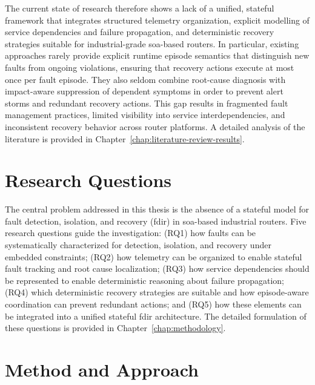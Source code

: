 The current state of research therefore shows a lack of a unified, stateful framework that integrates structured telemetry organization, explicit modelling of service dependencies and failure propagation, and deterministic recovery strategies suitable for industrial-grade \gls{soa}-based routers. In particular, existing approaches rarely provide explicit runtime episode semantics that distinguish new faults from ongoing violations, ensuring that recovery actions execute at most once per fault episode. They also seldom combine root-cause diagnosis with impact-aware suppression of dependent symptoms in order to prevent alert storms and redundant recovery actions. This gap results in fragmented fault management practices, limited visibility into service interdependencies, and inconsistent recovery behavior across router platforms. A detailed analysis of the literature is provided in Chapter~\ref{chap:literature-review-results}.

\section{Research Questions}\label{sec:intro-research-questions}

The central problem addressed in this thesis is the absence of a stateful model for fault detection, isolation, and recovery (\gls{fdir}) in \gls{soa}-based industrial routers. Five research questions guide the investigation: (RQ1) how faults can be systematically characterized for detection, isolation, and recovery under embedded constraints; (RQ2) how telemetry can be organized to enable stateful fault tracking and root cause localization; (RQ3) how service dependencies should be represented to enable deterministic reasoning about failure propagation; (RQ4) which deterministic recovery strategies are suitable and how episode-aware coordination can prevent redundant actions; and (RQ5) how these elements can be integrated into a unified stateful \gls{fdir} architecture. The detailed formulation of these questions is provided in Chapter~\ref{chap:methodology}.

\section{Method and Approach}\label{sec:intro-method}

